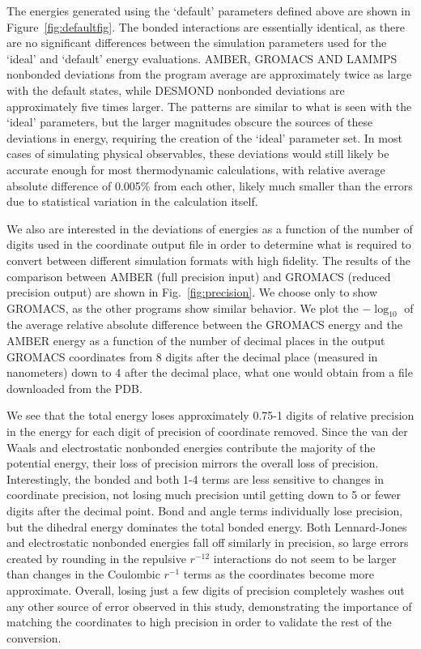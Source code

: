 The energies generated using the `default' parameters defined above
are shown in Figure~\ref{fig:defaultfig}. The bonded interactions are
essentially identical, as there are no significant differences between
the simulation parameters used for the `ideal' and `default' energy
evaluations. AMBER, GROMACS AND LAMMPS nonbonded deviations from the
program average are approximately twice as large with the default
states, while DESMOND nonbonded deviations are approximately five
times larger.  The patterns are similar to what is seen with the
`ideal' parameters, but the larger magnitudes obscure the sources of
these deviations in energy, requiring the creation of the `ideal'
parameter set. In most cases of simulating physical observables, these
deviations would still likely be accurate enough for most
thermodynamic calculations, with relative average absolute difference
of 0.005\% from each other, likely much smaller than the errors due to
statistical variation in the calculation itself.


We also are interested in the deviations of energies as a function of
the number of digits used in the coordinate output file in order to
determine what is required to convert between different simulation formats 
with high fidelity. The results of the comparison between AMBER 
(full precision input) and GROMACS
(reduced precision output) are shown in Fig.~\ref{fig:precision}.  We
choose only to show GROMACS, as the other programs show similar
behavior. We plot the $-\log_{10}$ of the average relative absolute
difference between the GROMACS energy and the AMBER energy as a
function of the number of decimal places in the output GROMACS
coordinates from 8 digits after the decimal place (measured in
nanometers) down to 4 after the decimal place, what one would obtain
from a file downloaded from the PDB.

We see that the total energy loses approximately 0.75-1 digits of
relative precision in the energy for each digit of precision of
coordinate removed. Since the van der Waals and electrostatic
nonbonded energies contribute the majority of the potential energy,
their loss of precision mirrors the overall loss of
precision. Interestingly, the bonded and both 1-4 terms are less
sensitive to changes in coordinate precision, not losing much
precision until getting down to 5 or fewer digits after the decimal
point. Bond and angle terms individually lose precision, but the
dihedral energy dominates the total bonded energy.  Both Lennard-Jones
and electrostatic nonbonded energies fall off similarly in precision,
so large errors created by rounding in the repulsive $r^{-12}$
interactions do not seem to be larger than changes in the Coulombic
$r^{-1}$ terms as the coordinates become more approximate.  Overall,
losing just a few digits of precision completely washes out any other
source of error observed in this study, demonstrating the importance
of matching the coordinates to high precision in order to validate the
rest of the conversion.

